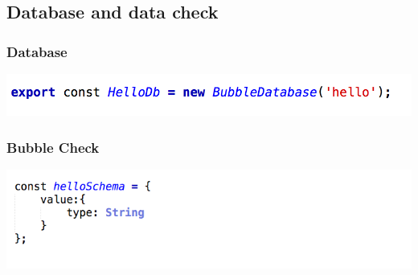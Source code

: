 \subsection{Database and data check}

\begin{frame}
	\frametitle{Database}
	\begin{center}
	\includegraphics[width=.8\textwidth]{code/helloDb.png}
	\end{center}
\end{frame}

\begin{frame}
	\frametitle{Bubble Check}
	\begin{center}
	\includegraphics[width=.8\textwidth]{code/hellocheck.png}
	\end{center}
\end{frame}
